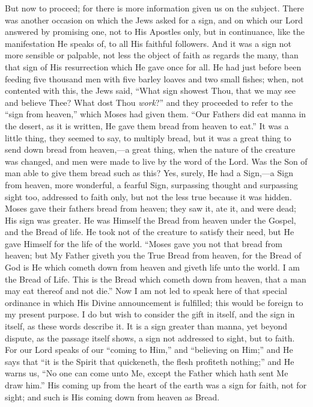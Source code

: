 But now to proceed; for there is more information given us on the
subject. There was another occasion on which the Jews asked for a sign,
and on which our Lord answered by promising one, not to His Apostles
only, but in continuance, like the manifestation He speaks of, to all
His faithful followers. And it was a sign not more sensible or palpable,
not less the object of faith as regards the many, than that sign of His
resurrection which He gave once for all. He had just before been feeding
five thousand men with five barley loaves and two small fishes; when,
not contented with this, the Jews said, ``What sign showest Thou,
that we may see and believe Thee? What dost Thou \emph{work}?'' and
they proceeded to refer to the ``sign from heaven,'' which Moses
had given them. ``Our Fathers did eat manna in the desert, as it is
written, He gave them bread from heaven to eat.'' It was a little
thing, they seemed to say, to multiply bread, but it was a great thing
to send down bread from heaven,—a great thing, when the nature of the
creature was changed, and men were made to live by the word of the Lord.
Was the Son of man able to give them bread such as this? Yes, surely, He
had a Sign,—a Sign from heaven, more wonderful, a fearful Sign,
surpassing thought and surpassing sight too, addressed to faith only,
but not the less true because it was hidden. Moses gave their fathers
bread from heaven; they saw it, ate it, and were dead; His sign was
greater. He was Himself the Bread from heaven under the Gospel, and the
Bread of life. He took not of the creature to satisfy their need, but He
gave Himself for the life of the world. ``Moses gave you not that
bread from heaven; but My Father giveth you the True Bread from heaven,
for the Bread of God is He which cometh down from heaven and giveth life
unto the world. I am the Bread of Life. This is the Bread which cometh
down from heaven, that a man may eat thereof and not die.'' Now I am
not led to speak here of that special ordinance in which His Divine
announcement is fulfilled; this would be foreign to my present purpose.
I do but wish to consider the gift in itself, and the sign in itself, as
these words describe it. It is a sign greater than manna, yet beyond
dispute, as the passage itself shows, a sign not addressed to sight, but
to faith. For our Lord speaks of our ``coming to Him,'' and
``believing on Him;'' and He says that ``it is the Spirit
that quickeneth, the flesh profiteth nothing;'' and He warns us,
``No one can come unto Me, except the Father which hath sent Me draw
him.'' His coming up from the heart of the earth was a sign for
faith, not for sight; and such is His coming down from heaven as Bread.

